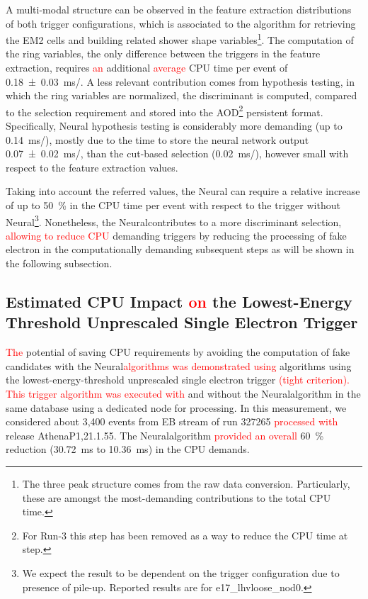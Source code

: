 A multi-modal structure can be observed in the feature extraction distributions
of both trigger configurations, which is associated to the algorithm
for retrieving the EM2 cells and building related shower shape
variables\footnote{The three peak structure comes from the raw data conversion.
	Particularly, these are amongst the most-demanding contributions to
	the \fastcalo total CPU time.}. The computation of the ring variables, the only difference between the
triggers in the \fastcalo feature extraction, requires \textcolor{red}{an} additional \textcolor{red}{average} CPU time per
event of \SI{0.18 \pm 0.03}{\ms/}. 
A less relevant contribution
comes from hypothesis testing, in which the ring variables are normalized, the
discriminant is computed, compared to the selection requirement and stored into
the AOD\footnote{For Run-3 this step has been removed as a way to reduce the CPU time at \fastcalo step.} 
persistent format. 
Specifically, Neural\rnn{} hypothesis testing is considerably more demanding
(up to \SI{0.14}{\ms/}), mostly due to the time 
to store the neural network output \SI{0.07 \pm 0.02}{\ms/}, 
than the cut-based selection
(\SI{0.02}{\ms/}), however small with respect to the feature
extraction values. 


Taking into account the referred values, the Neural\rnn{} can require a
relative increase of up to \SI{50}{\%} in the \fastcalo{} CPU time per event
with respect to the trigger without Neural\rnn\footnote{We expect the result to be
	dependent on the trigger configuration due to presence of pile-up. Reported
	results are for e17\_lhvloose\_nod0.}. Nonetheless, the Neural\rnn contributes to
a more discriminant selection, \textcolor{red}{allowing to reduce CPU} demanding triggers
by reducing the processing of fake electron in the computationally demanding
subsequent steps as will be shown in the following subsection.

\FloatBarrier
\subsection{Estimated CPU Impact \textcolor{red}{on} the Lowest-Energy Threshold Unprescaled
	Single Electron Trigger}\label{top:cpu_e26}

\textcolor{red}{The} potential of saving CPU requirements by
avoiding the computation of fake candidates with the Neural\rnn \textcolor{red}{algorithms was demonstrated using} algorithms using the
lowest-energy-threshold unprescaled single electron trigger
\textcolor{red}{(tight criterion). This trigger algorithm was executed with}
and without the Neural\rnn algorithm in the same database using a dedicated node for processing.
In this measurement, we considered about 3,400 events from EB stream of run
327265 \textcolor{red}{processed with} release AthenaP1,21.1.55. The Neural\rnn algorithm \textcolor{red}{provided an overall} 
\SI{60}{\%} reduction (\SI{30.72}{\milli\second} to \SI{10.36}{\milli\second})
in the CPU demands.


